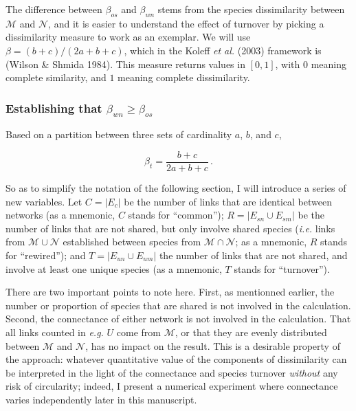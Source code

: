\documentclass[11pt]{article}
\begin{document}
The difference between \(\beta_{os}\) and \(\beta_{wn}\) stems from the
species dissimilarity between \(\mathcal{M}\) and \(\mathcal{N}\), and
it is easier to understand the effect of turnover by picking a
dissimilarity measure to work as an exemplar. We will use
\(\beta = (b+c)/(2a+b+c)\), which in the Koleff \emph{et al.} (2003)
framework is (Wilson \& Shmida 1984). This measure returns values in
\([0,1]\), with \(0\) meaning complete similarity, and \(1\) meaning
complete dissimilarity.

\hypertarget{establishing-that-beta_wn-ge-beta_os}{%
\subsubsection{\texorpdfstring{Establishing that
\(\beta_{wn} \ge \beta_{os}\)}{Establishing that \textbackslash beta\_\{wn\} \textbackslash ge \textbackslash beta\_\{os\}}}\label{establishing-that-beta_wn-ge-beta_os}}

Based on a partition between three sets of cardinality \(a\), \(b\), and
\(c\),

\[\beta_t = \frac{b+c}{2a+b+c}\,.\]

So as to simplify the notation of the following section, I will
introduce a series of new variables. Let \(C = |E_c|\) be the number of
links that are identical between networks (as a mnemonic, \(C\) stands
for ``common''); \(R = |E_{sn} \cup E_{sm}|\) be the number of links
that are not shared, but only involve shared species (\emph{i.e.} links
from \(\mathcal{M}\cup\mathcal{N}\) established between species from
\(\mathcal{M}\cap\mathcal{N}\); as a mnemonic, \(R\) stands for
``rewired''); and \(T = |E_{un} \cup E_{um}|\) the number of links that
are not shared, and involve at least one unique species (as a mnemonic,
\(T\) stands for ``turnover'').

There are two important points to note here. First, as mentionned
earlier, the number or proportion of species that are shared is not
involved in the calculation. Second, the connectance of either network
is not involved in the calculation. That all links counted in
\emph{e.g.} \(U\) come from \(\mathcal{M}\), or that they are evenly
distributed between \(\mathcal{M}\) and \(\mathcal{N}\), has no impact
on the result. This is a desirable property of the approach: whatever
quantitative value of the components of dissimilarity can be interpreted
in the light of the connectance and species turnover \emph{without} any
risk of circularity; indeed, I present a numerical experiment where
connectance varies independently later in this manuscript.
\end{document}

